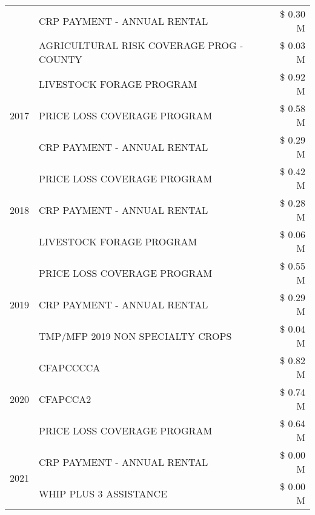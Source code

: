 \begin{tabular}{llr}
 & CRP PAYMENT - ANNUAL RENTAL                   & \$ 0.30 M \\
 & AGRICULTURAL RISK COVERAGE PROG - COUNTY      & \$ 0.03 M \\
\cline{1-3}
\multirow[t]{3}{*}{2017} & LIVESTOCK FORAGE PROGRAM & \$ 0.92 M \\
 & PRICE LOSS COVERAGE PROGRAM & \$ 0.58 M \\
 & CRP PAYMENT - ANNUAL RENTAL & \$ 0.29 M \\
\cline{1-3}
\multirow[t]{3}{*}{2018} & PRICE LOSS COVERAGE PROGRAM & \$ 0.42 M \\
 & CRP PAYMENT - ANNUAL RENTAL & \$ 0.28 M \\
 & LIVESTOCK FORAGE PROGRAM & \$ 0.06 M \\
\cline{1-3}
\multirow[t]{3}{*}{2019} & PRICE LOSS COVERAGE PROGRAM & \$ 0.55 M \\
 & CRP PAYMENT - ANNUAL RENTAL & \$ 0.29 M \\
 & TMP/MFP 2019 NON SPECIALTY CROPS & \$ 0.04 M \\
\cline{1-3}
\multirow[t]{3}{*}{2020} & CFAPCCCCA & \$ 0.82 M \\
 & CFAPCCA2 & \$ 0.74 M \\
 & PRICE LOSS COVERAGE PROGRAM & \$ 0.64 M \\
\cline{1-3}
\multirow[t]{2}{*}{2021} & CRP PAYMENT - ANNUAL RENTAL & \$ 0.00 M \\
 & WHIP PLUS 3 ASSISTANCE & \$ 0.00 M \\
\cline{1-3}
\bottomrule
\end{tabular}
